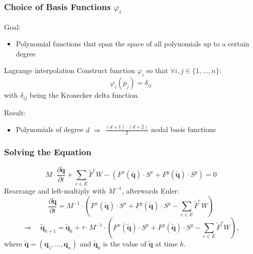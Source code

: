 \documentclass{beamer}
\newcommand{\pd}[2]{\dfrac{\partial #1}{\partial #2}}
\renewcommand{\phi}{\varphi}
\begin{document}
\begin{frame}
  \frametitle{Choice of Basis Functions $\phi_i$}
  Goal:
  \begin{itemize}
  \item Polynomial functions that span the space of all polynomials up to a certain degree
  \end{itemize}

  \begin{block}{Lagrange interpolation}
    Construct function $\phi_i$ so that $\forall i,j \in \{1, \dots, n\}$:
    \begin{equation*}
      \phi_i(p_j) = \delta_{ij}
    \end{equation*}
    with $\delta_{ij}$ being the Kronecker delta function.

    Result:
    \begin{itemize}
    \item Polynomials of degree $d$ $\Rightarrow$ $\frac{(d+1)\cdot(d+2)}{2}$ nodal basis functions
    \end{itemize}
  \end{block}
\end{frame}

%
%
%
%
\begin{frame}
  \frametitle{Solving the Equation}
  \begin{equation*}
    M \cdot \pd{\tilde{\mathbf{q}}}{t} +
    \sum_{e \in E} \tilde{F}^e W -
    \left(F^x(\tilde{\mathbf{q}}) \cdot S^x +
      F^y(\tilde{\mathbf{q}}) \cdot S^y\right) = 0
  \end{equation*}
  Rearrange and left-multiply with $M^{-1}$, afterwards Euler:
  \begin{equation*}
    \pd{\tilde{\mathbf{q}}}{t} =
    M^{-1} \cdot \left(
      F^x(\tilde{\mathbf{q}}) \cdot S^x +
      F^y(\tilde{\mathbf{q}}) \cdot S^y -
      \sum_{e \in E} \tilde{F}^e W\right
    )
  \end{equation*}
  \begin{equation*}
    \Rightarrow \quad
    \tilde{\mathbf{q}}_{k+1} =
    \tilde{\mathbf{q}}_{k} +
    \tau \cdot M^{-1} \cdot \left(
      F^x(\tilde{\mathbf{q}}) \cdot S^x +
      F^y(\tilde{\mathbf{q}}) \cdot S^y -
      \sum_{e \in E} \tilde{F}^e W\right
    ),
  \end{equation*}
  where $\tilde{\mathbf{q}} = (\mathbf{q}_1,\dots,\mathbf{q}_n)$ and $\tilde{\mathbf{q}}_k$ is the value of $\tilde{\mathbf{q}}$ at time $k$.
\end{frame}
\end{document}
